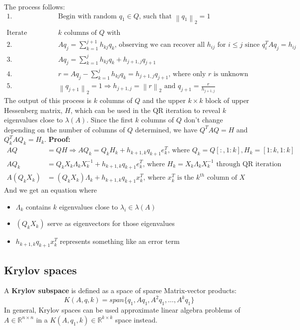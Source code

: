\documentclass{article}
\newcommand{\norm}[2]{\left\lVert#1\right\rVert_#2}
\begin{document}
The process follows:
\begin{align*}
    1. \; & \textrm{Begin with random } q_1 \in Q \textrm{, such that } \norm{q_1}{2} = 1\\ \\
    \textrm{Iterate through each of the first } & k \textrm{ columns of $Q$ with }\\
    2. \; & Aq_j = \sum_{k = 1}^{j+1} h_{kj}q_k \textrm{, observing we can recover all $h_{ij}$ for $i \leq j$ since } q_i^TAq_j = h_{ij}\\
    3. \; & Aq_j = \sum_{k = 1}^{j} h_{kj}q_k + h_{j+1, j}q_{j+1}\\
    4. \; & r = Aq_j - \sum_{k = 1}^{j} h_{kj}q_k = h_{j+1, j}q_{j+1} \textrm{, where only $r$ is unknown}\\
    5. \;& \norm{q_{j+1}}{2} = 1 \Longrightarrow h_{j+1, j} = \norm{r}{2} \textrm{ and } q_{j+1} = \frac{r}{h_{j+1, j}}
\end{align*}
The output of this process is $k$ columns of $Q$ and the upper $k \times k$ block of upper Hessenberg matrix, $H$, which can be used in the QR iteration to reveal $k$ eigenvalues close to $\lambda(A)$. Since the first $k$ columns of $Q$ don't change depending on the number of columns of $Q$ determined, we have $Q^TAQ = H$ and $Q_k^TAQ_k = H_k$.
\textbf{Proof:}
\begin{align*}
    AQ &= QH \Longrightarrow AQ_k = Q_kH_k + h_{k+1,k}q_{k+1}e_k^T \textrm{, where } Q_k = Q[:, 1:k], H_k = [1:k, 1:k]\\
    AQ_k &= Q_kX_k\Lambda_k X_k^{-1} + h_{k+1,k}q_{k+1}e_k^T \textrm{, where } H_k = X_k\Lambda_k X_k^{-1} \textrm{ through QR iteration}\\
    A(Q_kX_k) &= (Q_kX_k)\Lambda_k + h_{k+1,k}q_{k+1}x_k^T \textrm{, where } x_k^T \textrm{ is the $k^{th}$ column of } X
\end{align*}
And we get an equation where 
\begin{itemize}
    \item $\Lambda_k$ contains $k$ eigenvalues close to $\lambda_i \in \lambda(A)$
    \item $(Q_kX_k)$ serve as eigenvectors for those eigenvalues
    \item $h_{k+1,k}q_{k+1}x_k^T$ represents something like an error term
\end{itemize}

\subsection{Krylov spaces}
A \textbf{Krylov subspace} is defined as a space of sparse Matrix-vector products:
\begin{equation*}
    K(A, q, k) = span\{q_1, Aq_1, A^2q_1, \dots, A^kq_1 \}
\end{equation*}
In general, Krylov spaces can be used approximate linear algebra problems of $A \in \mathbb{R}^{n \times n}$ in a $K(A, q_1, k) \in \mathbb{R}^{k \times k}$ space instead.
\end{document}
